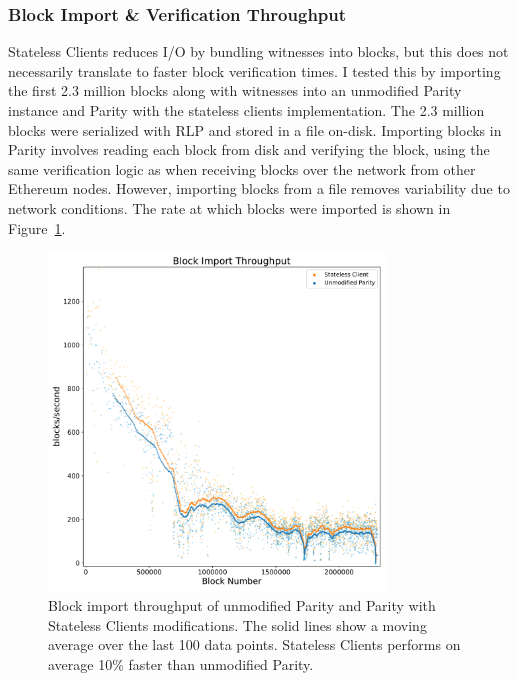\documentclass[12pt]{article}
\newcommand{\system}{stateless clients\xspace}
\newcommand{\System}{Stateless Clients\xspace}
\newcommand{\figurewidth}{0.8\textwidth}
\begin{document}
\subsubsection{Block Import \& Verification Throughput} \label{subsubsection:verificationtime}

\System reduces I/O by bundling witnesses into blocks, but this does not necessarily translate to faster block verification times. I tested this by importing the first 2.3 million blocks along with witnesses into an unmodified Parity instance and Parity with the \system implementation. The 2.3 million blocks were serialized with RLP and stored in a file on-disk. Importing blocks in Parity involves reading each block from disk and verifying the block, using the same verification logic as when receiving blocks over the network from other Ethereum nodes. However, importing blocks from a file removes variability due to network conditions. The rate at which blocks were imported is shown in Figure~\ref{fig:throughput}.

\begin{figure}[H]
  \centering
  \includegraphics[width=\figurewidth]{../figures/results/graphs/background/throughput.pdf}
  \caption{Block import throughput of unmodified Parity and Parity with \System modifications. The solid lines show a moving average over the last 100 data points. \System performs on average 10\% faster than unmodified Parity.}
  \label{fig:throughput}
\end{figure}
\end{document}
